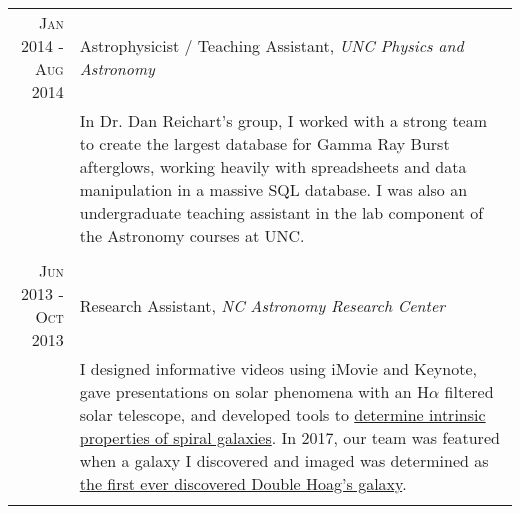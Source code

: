 \documentclass[a4paper,10pt]{article} %
\begin{document}
\begin{tabular}{r|p{11cm}}
\textsc{Jan 2014 - Aug 2014} & Astrophysicist / Teaching Assistant, \emph{UNC Physics and Astronomy} \\ 
& \footnotesize{In Dr. Dan Reichart's group, I worked with a strong team to create the largest database for Gamma Ray Burst afterglows, working heavily with spreadsheets and data manipulation in a massive SQL database. I was also an undergraduate teaching assistant in the lab component of the Astronomy courses at UNC.}\\
\multicolumn{2}{c}{} \\


\textsc{Jun 2013 - Oct 2013} & Research Assistant, \emph{NC Astronomy Research Center}\\
& \footnotesize{I designed informative videos using iMovie and Keynote, gave presentations on solar phenomena with an H$\alpha$ filtered solar telescope, and developed tools to \href{https://ui.adsabs.harvard.edu/abs/2014AAS...22345312T/abstract}{determine intrinsic properties of spiral galaxies}. In 2017, our team was featured when a galaxy I discovered and imaged was determined as \href{http://www.wired.co.uk/article/new-hoag-type-galaxy-discovered}{the first ever discovered Double Hoag's galaxy}.}\\
\multicolumn{2}{c}{} 


\end{tabular}
\end{document}
